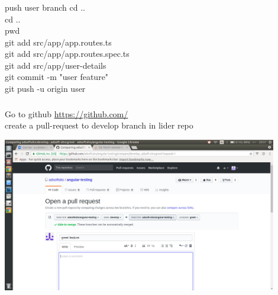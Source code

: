 \documentclass{beamer}
\begin{document}
\begin{frame}\frametitle{} 


\begin{block}{push user branch}
cd .. \\
cd .. \\
pwd  \\
git add src/app/app.routes.ts \\
git add src/app/app.routes.spec.ts \\
git add src/app/user-details \\
git commit -m "user feature" \\
git push -u origin user \\
\end{block}
\end{frame}



\begin{frame}\frametitle{} 

\begin{block}{Go to github}
\url{https://github.com/} \\

create a pull-request to develop branch in lider repo
\end{block}

\begin{center}
\includegraphics[width=0.9\textwidth]{pull-request.png}
\end{center}


\end{frame}
\end{document}
